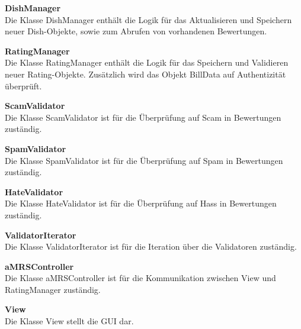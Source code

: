 \noindent \textbf{DishManager}\\
Die Klasse DishManager enthält die Logik für das Aktualisieren und Speichern neuer Dish-Objekte, sowie zum Abrufen von
vorhandenen Bewertungen.
\newline

\noindent \textbf{RatingManager}\\
Die Klasse RatingManager enthält die Logik für das Speichern und Validieren neuer Rating-Objekte. Zusätzlich wird das
Objekt BillData auf Authentizität überprüft.
\newline

\noindent \textbf{ScamValidator}\\
Die Klasse ScamValidator ist für die Überprüfung auf Scam in Bewertungen zuständig.
\newline

\noindent \textbf{SpamValidator}\\
Die Klasse SpamValidator ist für die Überprüfung auf Spam in Bewertungen zuständig.
\newline

\noindent \textbf{HateValidator}\\
Die Klasse HateValidator ist für die Überprüfung auf Hass in Bewertungen zuständig.
\newline

\noindent \textbf{ValidatorIterator}\\
Die Klasse ValidatorIterator ist für die Iteration über die Validatoren zuständig.
\newline

\noindent \textbf{aMRSController}\\
Die Klasse aMRSController ist für die Kommunikation zwischen View und RatingManager zuständig.
\newline

\noindent \textbf{View}\\
Die Klasse View stellt die GUI dar.
